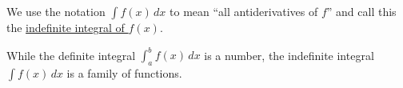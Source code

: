 \documentclass[main]{subfiles}
\begin{document}
\begin{enumerate}
  \pspace{\newpage}





\end{enumerate}
\begin{problemonly}
  \begin{framed}
    We use the notation $\displaystyle \int f(x)\,dx$ to mean ``all
    antiderivatives of $f$'' and call this the \uline{indefinite integral of $f(x)$}.

    While the definite integral $\displaystyle \int_a^b f(x)\,dx$ is a
    number, the indefinite integral $\displaystyle \int f(x)\,dx$ is a
    family of functions.
  \end{framed}
\end{problemonly}
\end{document}
